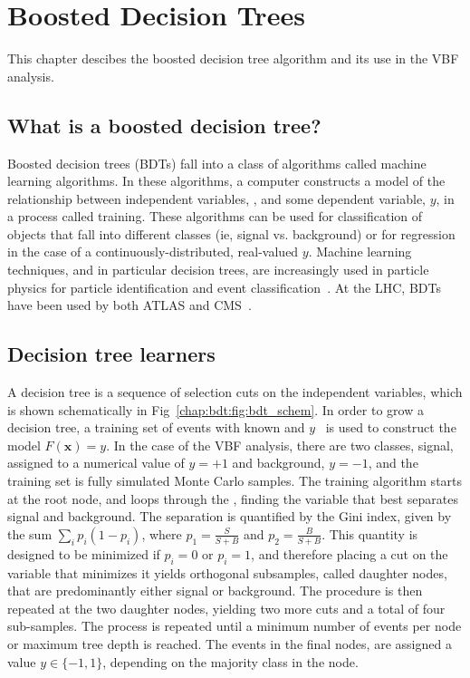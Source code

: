 \chapter{Boosted Decision Trees}
\label{chap:bdt}

This chapter descibes the boosted decision tree algorithm and its use
in the VBF \hwwlnln analysis.

\section{What is a boosted decision tree?}

Boosted decision trees (BDTs) fall into a class of algorithms called machine learning
algorithms. In these algorithms, a computer constructs a model of the
relationship between independent variables, , and some
dependent variable, $y$, in a process called training. These algorithms can
be used for classification of objects that fall into different classes
(ie, signal vs. background) or for regression in the case of a
continuously-distributed, real-valued $y$. Machine
learning techniques, and in particular decision trees, are increasingly used in
particle physics for particle identification and event
classification~\cite{bib:Roe:2004na}. At the LHC, BDTs have been used by both
ATLAS and CMS~\cite{bib:hww_mva,bib:htautau_mva,bib:Chatrchyan:2013zna}.%

\section{Decision tree learners}

A decision tree is a sequence of selection cuts on the independent
variables, which is shown schematically in
Fig~\ref{chap:bdt:fig:bdt_schem}. In order to grow a decision tree, a
training set of events with known  and $y$~ is used to
construct the model $F(\boldsymbol{x})=y$.
In the case of the VBF analysis, there are two classes, signal,
assigned to a numerical value of $y=+1$ and background, $y=-1$, and
the training set is fully simulated Monte Carlo samples. The training
algorithm starts at the root node, and loops through the ,
finding the variable
that best separates signal and background. The separation is
quantified by the Gini index, given by the sum
$\sum_i p_i(1-p_i)$, where $p_1=\frac{S}{S+B}$ and
$p_2=\frac{B}{S+B}$. This quantity is designed to be minimized if
$p_i=0$ or $p_i=1$, and therefore placing a cut on the variable that
minimizes it yields orthogonal subsamples, called daughter nodes, that are predominantly either
signal or background. The procedure is then repeated at the two
daughter nodes, yielding two more cuts and a total of four
sub-samples. The process is repeated until a minimum number of events 
per node or maximum tree depth is reached. The events in the final
nodes, are assigned a value $y\in \{-1,1\}$, depending on the
majority class in the node.

